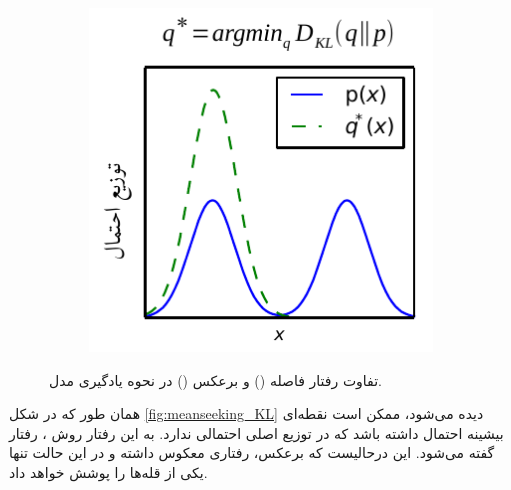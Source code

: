 \begin{figure}[h]
\begin{subfigure}[t!]{.4\textwidth}
		\includegraphics[height=1.\textwidth]{images/KLvsReverseKL_RKL.pdf}
		\caption{}
		\label{fig:meanseeking_RKL}
	\end{subfigure}
	\caption{
		تفاوت رفتار فاصله  () و  برعکس () در نحوه یادگیری مدل.
	}
\end{figure}
همان طور که در شکل \ref{fig:meanseeking_KL} دیده می‌شود، ممکن است نقطه‌ای بیشینه احتمال داشته باشد که در توزیع اصلی احتمالی ندارد. به این رفتار روش \maxlikelihood{}، رفتار 
 گفته می‌شود. این درحالیست که  برعکس، رفتاری معکوس داشته و در این حالت تنها یکی از قله‌ها را پوشش خواهد داد.
